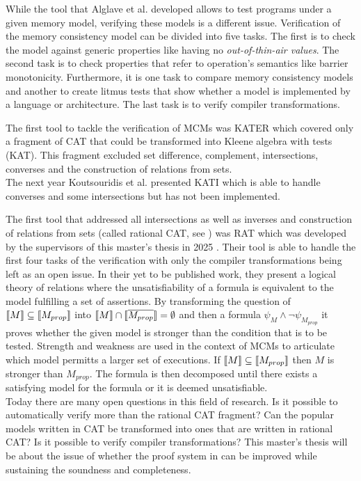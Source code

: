 \documentclass[a4paper,11pt,twoside, english]{article}
\begin{document}
While the tool that Alglave et al. developed allows to test programs under a given memory model, verifying these models is a different issue. Verification of the memory consistency model can be divided into five tasks. 
The first is to check the model against generic properties like having no \textit{out-of-thin-air values}. 
The second task is to check properties that refer to operation's semantics like barrier monotonicity. Furthermore, it is one task to compare memory consistency models and another to create litmus tests that show whether a model is implemented by a language or architecture. The last task is to verify compiler transformations.
  
The first tool to tackle the verification of MCMs was KATER \cite{Kok+23} which covered only a fragment of CAT that could be transformed into Kleene algebra with tests (KAT). This fragment excluded set difference, complement, intersections, converses and the construction of relations from sets. \\
The next year Koutsouridis et al. presented KATI \cite{Kou+24} which is able to handle converses and some intersections but has not been implemented.

The first tool that addressed all intersections as well as inverses and construction of relations from sets (called rational CAT, see ) was RAT which was developed by the supervisors of this master's thesis in 2025 \cite{GruMey25}. Their tool is able to handle the first four tasks of the verification with only the compiler transformations being left as an open issue. In their yet to be published work, they present a logical theory of relations where the unsatisfiability of a formula is equivalent to the model fulfilling a set of assertions.
By transforming the question of $\llbracket M \rrbracket \subseteq \llbracket M_{prop} \rrbracket$ into $\llbracket M \rrbracket \cap \llbracket \overline{M_{prop}} \rrbracket = \emptyset$ and then a formula $\psi_M \land \neg \psi_{M_{prop}}$ it proves whether the given model is stronger than the condition that is to be tested. Strength and weakness are used in the context of MCMs to articulate which model permitts a larger set of executions. If $\llbracket M \rrbracket \subseteq \llbracket M_{prop} \rrbracket$ then $M$ is stronger than $M_{prop}$.
The formula is then decomposed until there exists a satisfying model for the formula or it is deemed unsatisfiable. \\


Today there are many open questions in this field of research. Is it possible to automatically verify  more than the rational CAT fragment?
Can the popular models written in CAT be transformed into ones that are written in rational CAT?
Is it possible to verify compiler transformations?
This master's thesis will be about the issue of whether the proof system in \cite{GruMey25} can be improved while sustaining the soundness and completeness. 
\pagebreak
\end{document}
